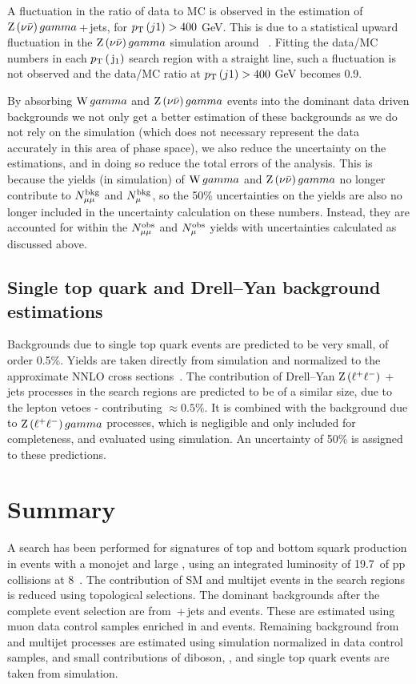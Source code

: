 A fluctuation in the ratio of data to MC is observed in the estimation of $\mathrm{Z}\, ( \nu \bar{\nu} )\, gamma$\,+\,jets, for $p_{\text{T}}\,(j1) > 400$ GeV.
This is due to a statistical upward fluctuation in the $\mathrm{Z}\, ( \nu \bar{\nu} )\, gamma$ simulation around ~\GeV.
Fitting the data/MC numbers in each $p_{\text{T}}\,(\,\mathrm{j}_1)$ search region with a straight line, 
such a fluctuation is not observed and the data/MC ratio at $p_{\text{T}}\,(j1) > 400$ GeV becomes 0.9.



By absorbing $\mathrm{W}\,gamma$ and $\mathrm{Z}\, ( \nu \bar{\nu} )\, gamma$ events into the dominant data driven backgrounds 
we not only get a better estimation of these backgrounds as we do not rely on the simulation 
(which does not necessary represent the data accurately in this area of phase space), 
we also reduce the uncertainty on the estimations, 
and in doing so reduce the total errors of the analysis.
This is because the yields (in simulation) of $\mathrm{W}\,gamma$ and $\mathrm{Z}\, ( \nu \bar{\nu} )\, gamma$ no longer contribute to $N^{\rm bkg}_{\mu\mu}$ and $N^{\rm bkg}_{\mu}$, so the 50\% uncertainties on the yields are also no longer included in the uncertainty calculation on these numbers. 
Instead, they are accounted for within the $N^{\rm obs}_{\mu\mu}$ and $N^{\rm obs}_{\mu}$ yields with uncertainties calculated as discussed above.


\subsection{Single top quark and Drell--Yan background estimations}

Backgrounds due to single top quark events are predicted to be very small, of order 0.5\%.
Yields are taken directly from simulation and normalized to the approximate \ac{NNLO} cross sections~\cite{ttbarxs}. 
The contribution of Drell--Yan $\mathrm{Z}\, ( \ell^{+} \ell^{-} )\,$\,+\,jets processes in the search regions are predicted to be of a similar size, due to the lepton vetoes - contributing $\approx0.5\%$.
It is combined with the background due to $\mathrm{Z}\, ( \ell^{+} \ell^{-} )\, gamma$ processes, which is negligible and only included for completeness,
and evaluated using simulation.
An uncertainty of 50\% is assigned to these predictions.


\section{Summary}
A search has been performed for signatures of top and bottom squark production in events with a monojet and large \METmu, using an integrated luminosity of 19.7~\fbinv of pp collisions at 8~\TeV. The contribution of SM \ttbar and multijet events in the search regions is reduced using topological selections. The dominant backgrounds after the complete event selection are from \znunubr\,+\,jets and \wpj events. These are estimated using muon data control samples enriched in \zmumubr and \wmunubr events. Remaining background from \ttbar and multijet processes are estimated using simulation normalized in data control samples, and small contributions of diboson, \zellellbr, and single top quark events are taken from simulation.


